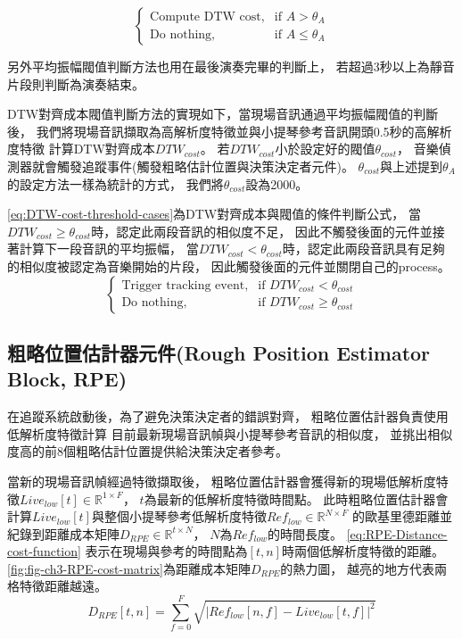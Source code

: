 \documentclass[class=NCU_thesis, crop=false]{standalone}
\begin{document}
\begin{equation} 
    \label{eq:amplitude-threshold-cases}
    \begin{cases}
        \text{Compute DTW cost}, & \text{if $A > \theta _{A}$} \\
        \text{Do nothing},  & \text{if $A \leq \theta _{A}$}
    \end{cases}
\end{equation}

另外平均振幅閥值判斷方法也用在最後演奏完畢的判斷上，
若超過3秒以上為靜音片段則判斷為演奏結束。

DTW對齊成本閥值判斷方法的實現如下，當現場音訊通過平均振幅閥值的判斷後，
我們將現場音訊擷取為高解析度特徵並與小提琴參考音訊開頭0.5秒的高解析度特徵
計算DTW對齊成本${DTW_{cost}}$。
若${DTW_{cost}}$小於設定好的閥值$\theta _{cost}$，
音樂偵測器就會觸發追蹤事件(觸發粗略估計位置與決策決定者元件)。
$\theta _{cost}$與上述提到$\theta _{A}$的設定方法一樣為統計的方式，
我們將$\theta _{cost}$設為2000。

\cref{eq:DTW-cost-threshold-cases}為DTW對齊成本與閥值的條件判斷公式，
當$DTW_{cost} \geq \theta _{cost}$時，認定此兩段音訊的相似度不足，
因此不觸發後面的元件並接著計算下一段音訊的平均振幅，
當$DTW_{cost}  < \theta _{cost}$時，認定此兩段音訊具有足夠的相似度被認定為音樂開始的片段，
因此觸發後面的元件並關閉自己的process。
\begin{equation}
    \label{eq:DTW-cost-threshold-cases}
    \begin{cases}
        \text{Trigger tracking event}, & \text{if $DTW_{cost} < \theta _{cost}$} \\
        \text{Do nothing}, & \text{if $DTW_{cost} \geq \theta _{cost}$}
    \end{cases}
\end{equation}

\subsection{粗略位置估計器元件(Rough Position Estimator Block, RPE)} \label{ch3-subst-RPE}
在追蹤系統啟動後，為了避免決策決定者的錯誤對齊，
粗略位置估計器負責使用低解析度特徵計算
目前最新現場音訊幀與小提琴參考音訊的相似度，
並挑出相似度高的前8個粗略估計位置提供給決策決定者參考。

當新的現場音訊幀經過特徵擷取後，
粗略位置估計器會獲得新的現場低解析度特徵$Live_{low}[t] \in \mathbb{R}^{1 \times F}$，
$t$為最新的低解析度特徵時間點。
此時粗略位置估計器會計算$Live_{low}[t]$與整個小提琴參考低解析度特徵$Ref_{low} \in \mathbb{R}^{N \times F}$
的歐基里德距離並紀錄到距離成本矩陣$D_{RPE} \in \mathbb{R}^{t \times N}$，
$N$為$Ref_{low}$的時間長度。
\cref{eq:RPE-Distance-cost-function}
表示在現場與參考的時間點為$[t, n]$時兩個低解析度特徵的距離。
\cref{fig:fig-ch3-RPE-cost-matrix}為距離成本矩陣$D_{RPE}$的熱力圖，
越亮的地方代表兩格特徵距離越遠。
\begin{equation}
    \label{eq:RPE-Distance-cost-function}
    D_{RPE}[t, n] = \sum_{f = 0}^{F}\sqrt{
    \left\lvert Ref_{low}[n, f]-Live_{low}[t, f]\right\rvert^{2}} 
\end{equation}
\end{document}
